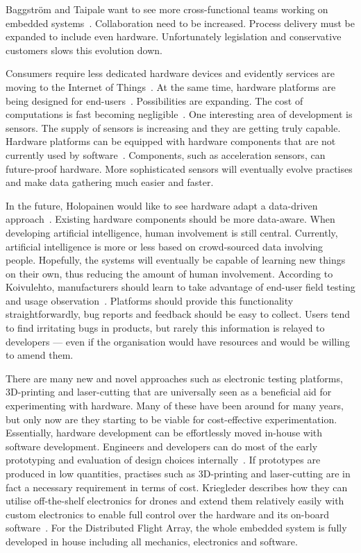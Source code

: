 \documentclass[english]{tktltiki2}
\begin{document}
Baggström and Taipale want to see more cross-functional teams working on embedded systems~\cite{BT15}. Collaboration need to be increased. Process delivery must be expanded to include even hardware. Unfortunately legislation and conservative customers slows this evolution down.

Consumers require less dedicated hardware devices and evidently services are moving to the Internet of Things~\cite{Koi15}. At the same time, hardware platforms are being designed for end-users~\cite{BT15}. Possibilities are expanding. The cost of computations is fast becoming negligible~\cite{Hol15a}. One interesting area of development is sensors. The supply of sensors is increasing and they are getting truly capable. Hardware platforms can be equipped with hardware components that are not currently used by software~\cite{BT15}. Components, such as acceleration sensors, can future-proof hardware. More sophisticated sensors will eventually evolve practises and make data gathering much easier and faster.

In the future, Holopainen would like to see hardware adapt a data-driven approach~\cite{Hol15a}. Existing hardware components should be more data-aware. When developing artificial intelligence, human involvement is still central. Currently, artificial intelligence is more or less based on crowd-sourced data involving people. Hopefully, the systems will eventually be capable of learning new things on their own, thus reducing the amount of human involvement. According to Koivulehto, manufacturers should learn to take advantage of end-user field testing and usage observation~\cite{Koi15}. Platforms should provide this functionality straightforwardly, bug reports and feedback should be easy to collect. Users tend to find irritating bugs in products, but rarely this information is relayed to developers — even if the organisation would have resources and would be willing to amend them.

There are many new and novel approaches such as electronic testing platforms, 3D-printing and laser-cutting that are universally seen as a beneficial aid for experimenting with hardware. Many of these have been around for many years, but only now are they starting to be viable for cost-effective experimentation. Essentially, hardware development can be effortlessly moved in-house with software development. Engineers and developers can do most of the early prototyping and evaluation of design choices internally~\cite{Kri15}. If prototypes are produced in low quantities, practises such as 3D-printing and laser-cutting are in fact a necessary requirement in terms of cost. Kriegleder describes how they can utilise off-the-shelf electronics for drones and extend them relatively easily with custom electronics to enable full control over the hardware and its on-board software~\cite{Kri15}. For the Distributed Flight Array, the whole embedded system is fully developed in house including all mechanics, electronics and software.
\end{document}
